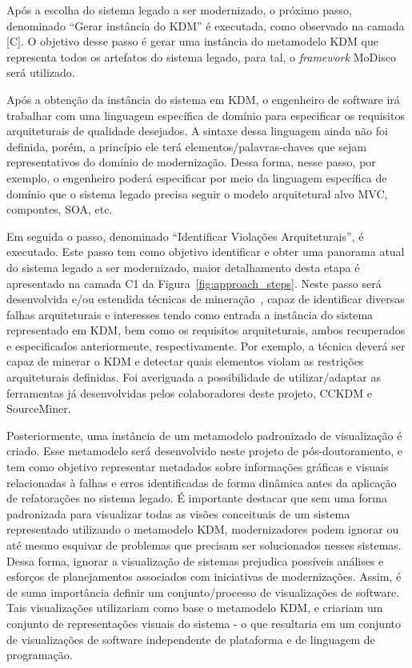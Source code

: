 \documentclass[12pt]{article}
\begin{document}
Após a escolha do sistema legado a ser modernizado, o próximo passo, denominado ``Gerar instância do KDM'' é executada, como observado na camada [C]. O objetivo desse passo é gerar uma instância do metamodelo KDM que representa todos os artefatos do sistema legado, para tal, o \textit{framework} MoDisco será utilizado.

Após a obtenção da instância do sistema em KDM, o engenheiro de software irá trabalhar com uma linguagem específica de domínio para especificar os requisitos arquiteturais de qualidade desejados. A sintaxe dessa linguagem ainda não foi definida, porém, a princípio ele terá elementos/palavras-chaves que sejam representativos do domínio de modernização. Dessa forma, nesse passo, por exemplo, o engenheiro poderá especificar por meio da linguagem específica de domínio que o sistema legado precisa seguir o modelo arquitetural alvo MVC, compontes, SOA, etc.

Em seguida o passo, denominado ``Identificar Violações Arquiteturais'', é executado. Este passo tem como objetivo identificar e obter uma panorama atual do sistema legado a ser modernizado, maior detalhamento desta etapa é apresentado na camada C1 da Figura~\ref{fig:approach_steps}. Neste passo será desenvolvida e/ou estendida técnicas de mineração~\cite{source_miner_glauco, daniel_san_journal}, capaz de identificar diversas falhas arquiteturais e interesses tendo como entrada a instância do sistema representado em KDM, bem como os requisitos arquiteturais, ambos recuperados e especificados anteriormente, respectivamente. Por exemplo, a técnica deverá ser capaz de minerar o KDM e detectar quais elementos violam as restrições arquiteturais definidas. Foi averiguada a possibilidade de utilizar/adaptar as ferramentas já desenvolvidas pelos colaboradores deste projeto, CCKDM e SourceMiner.  

Posteriormente, uma instância de um metamodelo padronizado de visualização é criado. Esse metamodelo será desenvolvido neste projeto de pós-doutoramento, e tem como objetivo representar metadados sobre informações gráficas e visuais relacionadas à falhas e erros identificadas de forma dinâmica antes da aplicação de refatorações no sistema legado. É importante destacar que sem uma forma padronizada para visualizar todas as visões conceituais de um sistema representado utilizando o metamodelo KDM, modernizadores podem ignorar ou até mesmo esquivar de problemas que precisam ser solucionados nesses sistemas. Dessa forma, ignorar a visualização de sistemas prejudica possíveis análises e esforços de planejamentos associados com iniciativas de modernizações. Assim, é de suma importância definir um conjunto/processo de visualizações de software. Tais visualizações utilizariam como base o metamodelo KDM, e criariam um conjunto de representações visuais do sistema - o que resultaria em um conjunto de visualizações de software independente de plataforma e de linguagem de programação.
\end{document}
